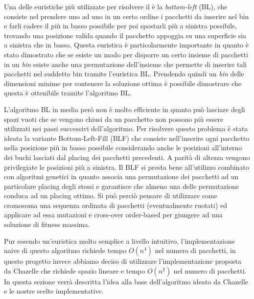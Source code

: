 Una delle euristiche più utilizzate per risolvere il \ddbpp{} è la \emph{bottom-left} (BL), che consiste nel prendere uno ad uno in un certo ordine i pacchetti da inserire nel bin e farli cadere il più in basso possibile per poi spostarli più a sinistra possibile, trovando una posizione valida quando il pacchetto appoggia su una superficie sia a sinistra che in basso. Questa euristica è particolarmente importante in quanto è stato dimostrato \cite{BLTheorem} che se esiste un modo per disporre un certo insieme di pacchetti in un \emph{bin} esiste anche una permutazione dell'insieme che permette di inserire tali pacchetti nel suddetto bin tramite l'euristica BL. Prendendo quindi un \emph{bin} delle dimensioni minime per contenere la soluzione ottima è possibile dimostrare che questa è ottenibile tramite l'algoritmo BL.

L'algoritmo BL in media però non è molto efficiente in quanto può lasciare degli spazi vuoti che se vengono chiusi da un pacchetto non possono più essere utilizzati nei passi successivi dell'algoritmo. Per risolvere questo problema è stata ideata la variante Bottom-Left-Fill (BLF) che consiste nell'inserire ogni pacchetto nella posizione più in basso possibile considerando anche le posizioni all'interno dei buchi lasciati dal placing dei pacchetti precedenti. A parità di altezza vengono privilegiate le posizioni più a sinistra. Il BLF si presta bene all'utilizzo combinato con algoritmi genetici in quanto associa una permutazione dei pacchetti ad un particolare placing degli stessi e garantisce che almeno una delle permutazione conduca ad un placing ottimo. Si può perciò pensare di utilizzare come cromosoma una sequenza ordinata di pacchetti (eventualmente ruotati) ed applicare ad essa mutazioni e cross-over order-based per giungere ad una soluzione di fitness massima.

Pur essendo un'euristica molto semplice a livello intuitivo, l'implementazione naive di questo algoritmo richiede tempo $O(n^4)$ nel numero di pacchetti, in questo progetto invece abbiamo deciso di utilizzare l'implementazione proposta da Chazelle \cite{chazelleBL} che richiede spazio lineare e tempo $O(n^2)$ nel numero di pacchetti. In questa sezione verrà descritta l'idea alla base dell'algoritmo ideato da Chazelle e le nostre scelte implementative. 

